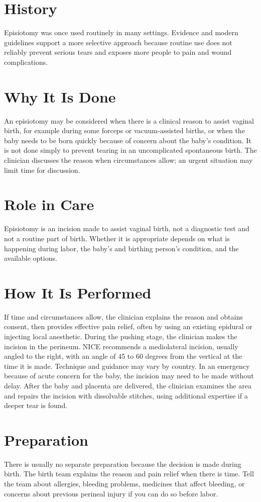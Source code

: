 \section*{History}
Episiotomy was once used routinely in many settings. Evidence and modern guidelines support a more selective approach because routine use does not reliably prevent serious tears and exposes more people to pain and wound complications.

\section*{Why It Is Done}
An episiotomy may be considered when there is a clinical reason to assist vaginal birth, for example during some forceps or vacuum-assisted births, or when the baby needs to be born quickly because of concern about the baby's condition. It is not done simply to prevent tearing in an uncomplicated spontaneous birth. The clinician discusses the reason when circumstances allow; an urgent situation may limit time for discussion.

\section*{Role in Care}
Episiotomy is an incision made to assist vaginal birth, not a diagnostic test and not a routine part of birth. Whether it is appropriate depends on what is happening during labor, the baby's and birthing person's condition, and the available options.

\section*{How It Is Performed}
If time and circumstances allow, the clinician explains the reason and obtains consent, then provides effective pain relief, often by using an existing epidural or injecting local anesthetic. During the pushing stage, the clinician makes the incision in the perineum. NICE recommends a mediolateral incision, usually angled to the right, with an angle of 45 to 60 degrees from the vertical at the time it is made. Technique and guidance may vary by country. In an emergency because of acute concern for the baby, the incision may need to be made without delay. After the baby and placenta are delivered, the clinician examines the area and repairs the incision with dissolvable stitches, using additional expertise if a deeper tear is found.

\section*{Preparation}
There is usually no separate preparation because the decision is made during birth. The birth team explains the reason and pain relief when there is time. Tell the team about allergies, bleeding problems, medicines that affect bleeding, or concerns about previous perineal injury if you can do so before labor.

